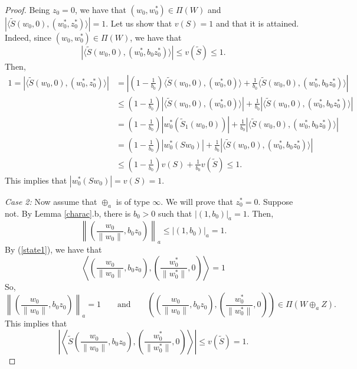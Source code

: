 \documentclass[10pt,a4paper]{amsart}
\theoremstyle{plain}
\theoremstyle{definition}
\renewcommand{\leq}{\leqslant}
\begin{document}
\begin{proof}
\noindent
Being $z_0 = 0$, we have that $(w_0, w_0^*) \in \Pi(W)$ and $| \langle \widetilde{S}(w_0, 0), (w_0^*, z_0^*) \rangle | = 1$. Let us show that $v(S)=1$ and that it is attained. Indeed, since $(w_0, w_0^*) \in \Pi(W)$, we have that
\begin{equation*}
	| \langle \widetilde{S}(w_0, 0), (w_0^*, b_0 z_0^*) \rangle | \leq v(\widetilde{S}) \leq 1.	
\end{equation*}
Then,
\begin{align*}
1 = | \langle \widetilde{S}(w_0, 0), (w_0^*, z_0^*) \rangle|
&= \left| \left( 1 - \frac{1}{b_0} \right) \langle \widetilde{S}(w_0, 0), (w_0^*, 0) \rangle + \frac{1}{b_0} \langle \widetilde{S}(w_0, 0), (w_0^*, b_0 z_0^*) \rangle \right| \\
&\leq 	 \left( 1 - \frac{1}{b_0} \right) | \langle \widetilde{S}(w_0, 0), (w_0^*, 0) \rangle| + \frac{1}{b_0} |\langle \widetilde{S}(w_0, 0), (w_0^*, b_0 z_0^*) \rangle | \\
&= \left( 1 - \frac{1}{b_0} \right) |  w_0^*(\widetilde{S}_1(w_0, 0)) | + \frac{1}{b_0} |\langle \widetilde{S}(w_0, 0), (w_0^*, b_0 z_0^*) \rangle | \\
&= \left( 1 - \frac{1}{b_0} \right) | w_0^*(Sw_0)| + \frac{1}{b_0} |\langle \widetilde{S}(w_0, 0), (w_0^*, b_0 z_0^*) \rangle | \\
&\leq \left(1 - \frac{1}{b_0} \right) v(S) + \frac{1}{b_0} v(\widetilde{S}) \leq 1.
\end{align*}
This implies that $|w_0^*(Sw_0)| = v(S) = 1$.


\noindent
{\it Case 2:} Now assume that $\oplus_a$ is of type $\infty$. We will prove that $z_0^* = 0$. Suppose not. By Lemma \ref{charac}.b, there is $b_0 > 0$ such that $|(1, b_0)|_a = 1$. Then,
\begin{equation*}
\left\| \left(\frac{w_0}{\|w_0\|}, b_0 z_0 \right) \right\|_a \leq |(1, b_0)|_a = 1.
\end{equation*}
By (\ref{state1}), we have that
\begin{equation*}
\left \langle \left( \frac{w_0}{\|w_0\|}, b_0 z_0 \right), \left( \frac{w_0^*}{\|w_0^*\|} , 0 \right) \right \rangle = 1	
\end{equation*}
So,
\begin{equation*}
\left\| \left(\frac{w_0}{\|w_0\|}, b_0 z_0 \right) \right\|_a = 1 \qquad \text{and} \qquad \left( \left( \frac{w_0}{\|w_0\|}, b_0 z_0 \right), \left( \frac{w_0^*}{\|w_0^*\|} , 0 \right) \right) \in \Pi(W \oplus_a Z).
\end{equation*}
This implies that
\begin{equation*}
\left| \left \langle \widetilde{S} \left( \frac{w_0}{\|w_0\|}, b_0 z_0 \right), \left( \frac{w_0^*}{\|w_0^*\|}, 0 \right) \right \rangle \right| \leq v(\widetilde{S}) = 1.	
\end{equation*}


\end{proof}
\end{document}
